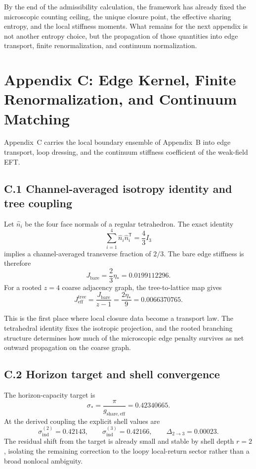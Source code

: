 \documentclass[11pt]{article}
\begin{document}
By the end of the admissibility calculation, the framework has already fixed the microscopic counting ceiling, the unique closure point, the effective sharing entropy, and the local stiffness moments. What remains for the next appendix is not another entropy choice, but the propagation of those quantities into edge transport, finite renormalization, and continuum normalization.

\section*{Appendix C: Edge Kernel, Finite Renormalization, and Continuum Matching}

Appendix~C carries the local boundary ensemble of Appendix~B into edge transport, loop dressing, and the continuum stiffness coefficient of the weak-field EFT.

\subsection*{C.1 Channel-averaged isotropy identity and tree coupling}

Let $\hat n_i$ be the four face normals of a regular tetrahedron. The exact identity
\[
\sum_{i=1}^4 \hat n_i\hat n_i^{\mathsf T}=\frac{4}{3}I_3
\]
implies a channel-averaged transverse fraction of $2/3$. The bare edge stiffness is therefore
\[
J_{\mathrm{bare}}=\frac{2}{3}\eta_*=0.0199112296.
\]
For a rooted $z=4$ coarse adjacency graph, the tree-to-lattice map gives
\[
J_{\mathrm{eff}}^{\mathrm{tree}}=\frac{J_{\mathrm{bare}}}{z-1}=\frac{2\eta_*}{9}=0.0066370765.
\]

This is the first place where local closure data become a transport law. The tetrahedral identity fixes the isotropic projection, and the rooted branching structure determines how much of the microscopic edge penalty survives as net outward propagation on the coarse graph.

\subsection*{C.2 Horizon target and shell convergence}

The horizon-capacity target is
\[
\sigma_*=\frac{\pi}{g_{\mathrm{share,eff}}}=0.42340665.
\]
At the derived coupling the explicit shell values are
\[
\sigma_{\mathrm{ind}}^{(2)}=0.42143,
\qquad
\sigma_{\mathrm{ind}}^{(3)}=0.42166,
\qquad
\Delta_{2\to 3}=0.00023.
\]
The residual shift from the target is already small and stable by shell depth $r=2$, isolating the remaining correction to the loopy local-return sector rather than a broad nonlocal ambiguity.
\end{document}
